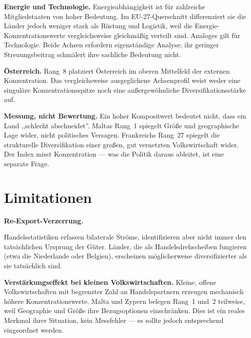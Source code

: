 \begin{sloppypar}
\textbf{Energie und Technologie.}
Energie\-abh\"angigkeit ist f\"ur zahlreiche Mitgliedstaaten von
hoher Bedeutung.  Im EU-27-Querschnitt differenziert sie die
L\"ander jedoch weniger stark als R\"ustung und Logistik, weil die
Energie-Konzentrations\-werte vergleichsweise gleichm\"a\ss ig
verteilt sind.  Analoges gilt f\"ur Technologie.  Beide Achsen
erfordern eigenst\"andige Analyse; ihr geringer
Streuungs\-beitrag schm\"alert ihre sachliche Bedeutung nicht.
\end{sloppypar}

\begin{sloppypar}
\textbf{\"Osterreich.}
Rang~8 platziert \"Osterreich im oberen Mittelfeld der externen
Konzentration.  Das vergleichsweise ausgeglichene Achsen\-profil
weist weder eine singul\"are Konzentrations\-spitze noch eine
au\ss ergew\"ohnliche Diversifikations\-st\"arke auf.
\end{sloppypar}

\begin{sloppypar}
\textbf{Messung, nicht Bewertung.}
Ein hoher Kompositwert bedeutet nicht, dass ein Land ,,schlecht
abschneidet''.  Maltas Rang~1 spiegelt Gr\"o\ss e und
geographische Lage wider, nicht politisches Versagen.
Frankreichs Rang~27 spiegelt die strukturelle Diversifikation
einer gro\ss en, gut vernetzten Volkswirtschaft wider.  Der Index
misst Konzentration --- was die Politik daraus ableitet, ist eine
separate Frage.
\end{sloppypar}


\section{Limitationen}
\label{sec:limitationen}

\textbf{Re-Export-Verzerrung.}
\begin{sloppypar}
Handelsstatistiken erfassen bilaterale Str\"ome, identifizieren
aber nicht immer den tats\"achlichen Ursprung der G\"uter.
L\"ander, die als Handels\-drehscheiben fungieren (etwa die
Niederlande oder Belgien), erscheinen m\"oglicherweise
diversifizierter als sie tats\"achlich sind.
\end{sloppypar}

\begin{sloppypar}
\textbf{Verst\"arkungseffekt bei kleinen Volkswirtschaften.}
Kleine, offene Volkswirtschaften mit begrenzter Zahl an
Handelspartnern erzeugen mechanisch h\"ohere
Konzentrations\-werte.  Malta und Zypern belegen Rang~1 und~2
teilweise, weil Geographie und Gr\"o\ss e ihre Bezugsoptionen
einschr\"anken.  Dies ist ein reales Merkmal ihrer Situation, kein
Messfehler --- es sollte jedoch entsprechend eingeordnet werden.
\end{sloppypar}

